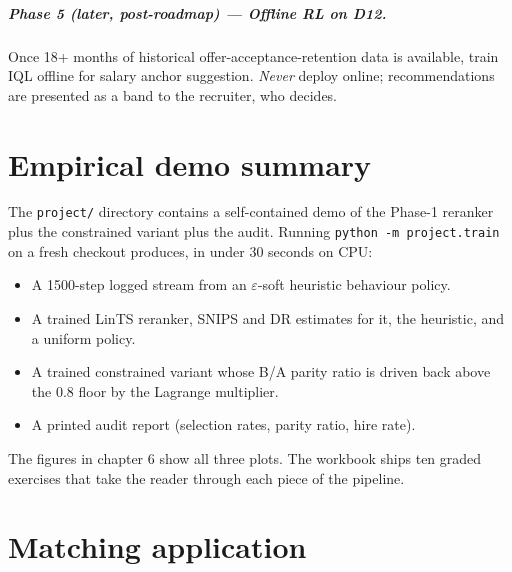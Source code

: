 \documentclass[11pt,oneside]{scrbook}
\begin{document}
\paragraph{Phase 5 (later, post-roadmap) --- Offline RL on D12.}
Once 18+ months of historical offer-acceptance-retention data is
available, train IQL offline for salary anchor suggestion. \emph{Never}
deploy online; recommendations are presented as a band to the recruiter,
who decides.

\chapter{Empirical demo summary}

The \texttt{project/} directory contains a self-contained demo of the
Phase-1 reranker plus the constrained variant plus the audit. Running
\texttt{python -m project.train} on a fresh checkout produces, in under
30 seconds on CPU:

\begin{itemize}
  \item A 1500-step logged stream from an $\varepsilon$-soft heuristic
        behaviour policy.
  \item A trained LinTS reranker, SNIPS and DR estimates for it, the
        heuristic, and a uniform policy.
  \item A trained constrained variant whose B/A parity ratio is driven
        back above the 0.8 floor by the Lagrange multiplier.
  \item A printed audit report (selection rates, parity ratio, hire
        rate).
\end{itemize}

The figures in chapter 6 show all three plots. The workbook ships ten
graded exercises that take the reader through each piece of the
pipeline.

\chapter{Matching application}
\end{document}
